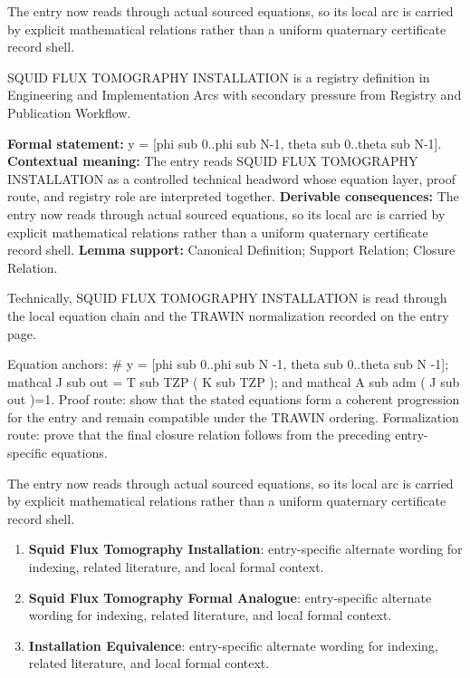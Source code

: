 The entry now reads through actual sourced equations, so its local arc is carried by explicit mathematical relations rather than a uniform quaternary certificate record shell.
\clearpage


\begingroup\small
{}
SQUID FLUX TOMOGRAPHY INSTALLATION is a registry definition in Engineering and Implementation Arcs with secondary pressure from Registry and Publication Workflow.

\begingroup\footnotesize\setlength{\emergencystretch}{3em}\sloppy
\textbf{Formal statement:} y = [phi sub 0..phi sub N-1, theta sub 0..theta sub N-1]. \textbf{Contextual meaning:} The entry reads SQUID FLUX TOMOGRAPHY INSTALLATION as a controlled technical headword whose equation layer, proof route, and registry role are interpreted together. \textbf{Derivable consequences:} The entry now reads through actual sourced equations, so its local arc is carried by explicit mathematical relations rather than a uniform quaternary certificate record shell. \textbf{Lemma support:} Canonical Definition; Support Relation; Closure Relation.\par
\endgroup

Technically, SQUID FLUX TOMOGRAPHY INSTALLATION is read through the local equation chain and the TRAWIN normalization recorded on the entry page.

Equation anchors: \# y = [phi sub 0..phi sub N -1, theta sub 0..theta sub N -1]; mathcal J sub out = T sub TZP ( K sub TZP ); and mathcal A sub adm ( J sub out )=1. Proof route: show that the stated equations form a coherent progression for the entry and remain compatible under the TRAWIN ordering. Formalization route: prove that the final closure relation follows from the preceding entry-specific equations.

The entry now reads through actual sourced equations, so its local arc is carried by explicit mathematical relations rather than a uniform quaternary certificate record shell.
\endgroup

\begin{enumerate}[leftmargin=1.6em,itemsep=6pt,topsep=4pt]
\item \textbf{Squid Flux Tomography Installation}: entry-specific alternate wording for indexing, related literature, and local formal context.
\item \textbf{Squid Flux Tomography Formal Analogue}: entry-specific alternate wording for indexing, related literature, and local formal context.
\item \textbf{Installation Equivalence}: entry-specific alternate wording for indexing, related literature, and local formal context.
\end{enumerate}

